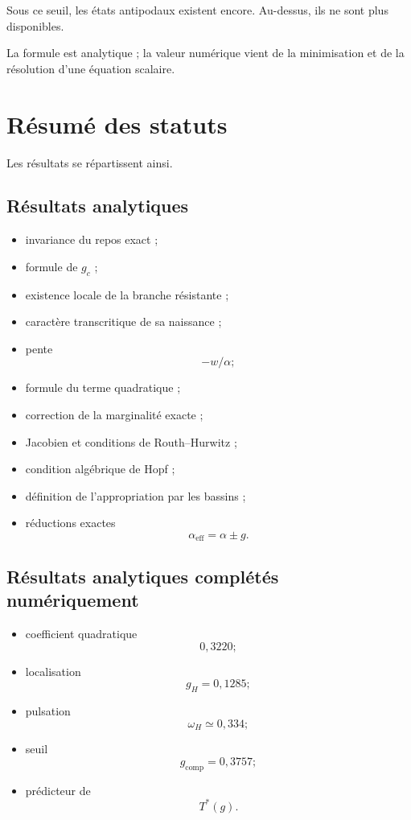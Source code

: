 Sous ce seuil, les états antipodaux existent encore. Au-dessus, ils ne
sont plus disponibles.

La formule est analytique ; la valeur numérique vient de la
minimisation et de la résolution d'une équation scalaire.

\section{Résumé des statuts}
\label{annexe-resistance-resume-statuts}

Les résultats se répartissent ainsi.

\subsection{Résultats analytiques}

\begin{itemize}
\item
  invariance du repos exact ;
\item
  formule de \(g_c\) ;
\item
  existence locale de la branche résistante ;
\item
  caractère transcritique de sa naissance ;
\item
  pente
  \[
  -w/\alpha;
  \]
\item
  formule du terme quadratique ;
\item
  correction de la marginalité exacte ;
\item
  Jacobien et conditions de Routh--Hurwitz ;
\item
  condition algébrique de Hopf ;
\item
  définition de l'appropriation par les bassins ;
\item
  réductions exactes
  \[
  \alpha_{\mathrm{eff}}=\alpha\pm g.
  \]
\end{itemize}

\subsection{Résultats analytiques complétés numériquement}

\begin{itemize}
\item
  coefficient quadratique
  \[
  0{,}3220;
  \]
\item
  localisation
  \[
  g_H=0{,}1285;
  \]
\item
  pulsation
  \[
  \omega_H\simeq0{,}334;
  \]
\item
  seuil
  \[
  g_{\mathrm{comp}}=0{,}3757;
  \]
\item
  prédicteur de
  \[
  T^\ast(g).
  \]
\end{itemize}

